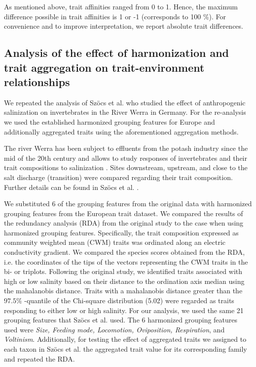 \documentclass{article}
\begin{document}
As mentioned above, trait affinities ranged from 0 to 1. Hence, the maximum difference possible in trait affinities is 1 or -1 (corresponds to 100 \%). For convenience and to improve interpretation, we report absolute trait differences.



\subsection*{Analysis of the effect of harmonization and trait aggregation on trait-environment relationships}

We repeated the analysis of Szöcs et al. \cite{szocs_effects_2014} who studied the effect of anthropogenic salinization on invertebrates in the River Werra in Germany. For the re-analysis we used the established harmonized grouping features for Europe and additionally aggregated traits using the aforementioned aggregation methods. 

The river Werra has been subject to effluents from the potash industry since the mid of the 20th century and allows to study responses of invertebrates and their trait compositions to salinization \cite{bathe_biological_2011}. Sites downstream, upstream, and close to the salt discharge (transition) were compared regarding their trait composition. Further details can be found in Szöcs et al. \cite{szocs_effects_2014}. 

We substituted 6 of the grouping features from the original data with harmonized grouping features from the European trait dataset. We compared the results of the redundancy analysis (RDA) from the original study to the case when using harmonized grouping features. Specifically, the trait composition expressed as community weighted mean (CWM) traits was ordinated along an electric conductivity gradient. We compared the species scores obtained from the RDA, i.e. the coordinates of the tips of the vectors representing the CWM traits in the bi- or triplots. Following the original study, we identified traits associated with high or low salinity based on their distance to the ordination axis median using the mahalanobis distance. Traits with a mahalanobis distance greater than the $97.5 \%$ -quantile of the Chi-square distribution (5.02) were regarded as traits responding to either low or high salinity. For our analysis, we used the same 21 grouping features that Szöcs et al. \cite{szocs_effects_2014} used. The 6 harmonized grouping features used were \textit{Size, Feeding mode, Locomotion, Oviposition, Respiration}, and \textit{Voltinism}. Additionally, for testing the effect of aggregated traits we assigned to each taxon in Szöcs et al. \cite{szocs_effects_2014} the aggregated trait value for its corresponding family and repeated the RDA.  
\end{document}
